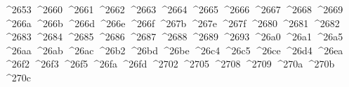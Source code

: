 {  ^^^^2653%
  ^^^^2660%
  ^^^^2661%
  ^^^^2662%
  ^^^^2663%
  ^^^^2664%
  ^^^^2665%
  ^^^^2666%
  ^^^^2667%
  ^^^^2668%
  ^^^^2669%
  ^^^^266a%
  ^^^^266b%
  ^^^^266d%
  ^^^^266e%
  ^^^^266f%
  ^^^^267b%
  ^^^^267e%
  ^^^^267f%
  ^^^^2680%
  ^^^^2681%
  ^^^^2682%
  ^^^^2683%
  ^^^^2684%
  ^^^^2685%
  ^^^^2686%
  ^^^^2687%
  ^^^^2688%
  ^^^^2689%
  ^^^^2693%
  ^^^^26a0%
  ^^^^26a1%
  ^^^^26a5%
  ^^^^26aa%
  ^^^^26ab%
  ^^^^26ac%
  ^^^^26b2%
  ^^^^26bd%
  ^^^^26be%
  ^^^^26c4%
  ^^^^26c5%
  ^^^^26ce%
  ^^^^26d4%
  ^^^^26ea%
  ^^^^26f2%
  ^^^^26f3%
  ^^^^26f5%
  ^^^^26fa%
  ^^^^26fd%
  ^^^^2702%
  ^^^^2705%
  ^^^^2708%
  ^^^^2709%
  ^^^^270a%
  ^^^^270b%
  ^^^^270c%
}
